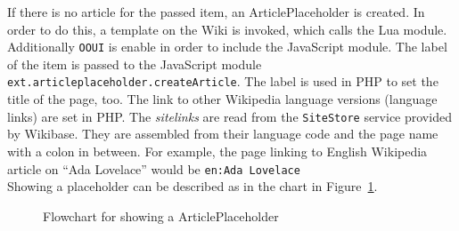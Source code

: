 If there is no article for the passed item, an ArticlePlaceholder is created. In order to do this, a template on the Wiki is invoked, which calls the Lua module. Additionally \texttt{\justify OOUI} is enable in order to include the JavaScript module. The label of the item is passed to the JavaScript module \texttt{\justify ext.articleplaceholder.createArticle}. The label is used in PHP to set the title of the page, too. The link to other Wikipedia language versions (language links) are set in PHP. The \textit{sitelinks} are read from the \texttt{\justify SiteStore} service provided by Wikibase. They are assembled from their language code and the page name with a colon in between. For example, the page linking to English Wikipedia article on ``Ada Lovelace'' would be \texttt{\justify en:Ada Lovelace}\\
Showing a placeholder can be described as in the chart in Figure~\ref{fig:showpl}. 
\begin{figure}[H]
	\centering
	
	\caption{Flowchart for showing a ArticlePlaceholder}
	\label{fig:showpl}
\end{figure}
